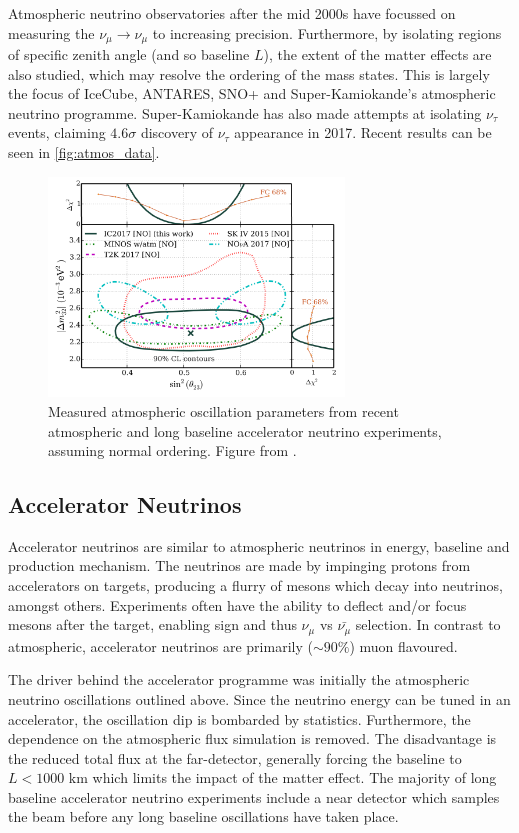 Atmospheric neutrino observatories after the mid 2000s have focussed on measuring the $\nu_\mu\rightarrow\nu_\mu$ to increasing precision. Furthermore, by isolating regions of specific zenith angle (and so baseline $L$), the extent of the matter effects are also studied, which may resolve the ordering of the mass states. This is largely the focus of IceCube\cite{icecube}, ANTARES\cite{antares}, SNO+ and Super-Kamiokande's atmospheric neutrino programme. Super-Kamiokande has also made attempts at isolating $\nu_\tau$ events\cite{superk_tau}, claiming $4.6\sigma$ discovery of $\nu_\tau$ appearance in 2017. Recent results can be seen in \autoref{fig:atmos_data}.
\begin{figure}[h]
	\includegraphics[width=0.7\textwidth, trim={0mm 0mm 0mm 0mm}, clip,page=1]{figures/theory/icecube_comp}
	\caption{Measured atmospheric oscillation parameters from recent atmospheric and long baseline accelerator neutrino experiments, assuming normal ordering. Figure from \cite{icecube}.}
	\label{fig:atmos_data}
\end{figure}

\subsection{Accelerator Neutrinos}
Accelerator neutrinos are similar to atmospheric neutrinos in energy, baseline and production mechanism. The neutrinos are made by impinging protons from accelerators on targets, producing a flurry of mesons which decay into neutrinos, amongst others. Experiments often have the ability to deflect and/or focus mesons after the target, enabling sign and thus $\nu_\mu$ vs $\bar{\nu_\mu}$ selection. In contrast to atmospheric, accelerator neutrinos are primarily ($\sim90\%$) muon flavoured.

The driver behind the accelerator programme was initially the atmospheric neutrino oscillations outlined above. Since the neutrino energy can be tuned in an accelerator, the oscillation dip is bombarded by statistics. Furthermore, the dependence on the atmospheric flux simulation is removed\cite{lbnl_review}. The disadvantage is the reduced total flux at the far-detector, generally forcing the baseline to $L<1000\text{ km}$ which limits the impact of the matter effect. The majority of long baseline accelerator neutrino experiments include a near detector which samples the beam before any long baseline oscillations have taken place.

